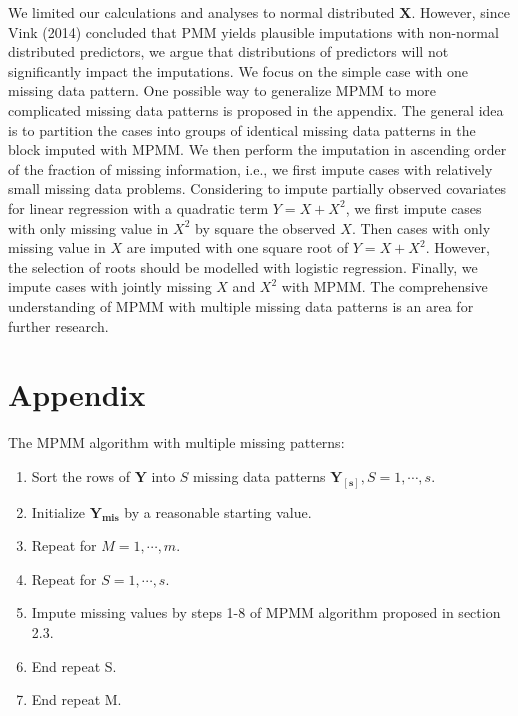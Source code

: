 	We limited our calculations and analyses to normal distributed $\boldsymbol{X}$. However, since Vink (2014) concluded that PMM yields plausible imputations with non-normal distributed predictors, we argue that distributions of predictors will not significantly impact the imputations. We focus on the simple case with one missing data pattern. One possible way to generalize MPMM to more complicated missing data patterns is proposed in the appendix. The general idea is to partition the cases into groups of identical missing data patterns in the block imputed with MPMM. We then perform the imputation in ascending order of the fraction of missing information, i.e., we first impute cases with relatively small missing data problems. Considering to impute partially observed covariates for linear regression with a quadratic term $Y = X + X^2$, we first impute cases with only missing value in $X^2$ by square the observed $X$. Then cases with only missing value in $X$ are imputed with one square root of $Y = X + X^2$. However, the selection of roots should be modelled with logistic regression. Finally, we impute cases with jointly missing $X$ and $X^2$ with MPMM. The comprehensive understanding of MPMM with multiple missing data patterns is an area for further research.         
	
	\section*{Appendix}
	The MPMM algorithm with multiple missing patterns:
	\begin{enumerate}
	\item Sort the rows of $\boldsymbol{Y}$ into $S$ missing data patterns $\boldsymbol{Y_{[s]}}, S=1,\cdots,s$.
	\item Initialize $\boldsymbol{Y_{mis}}$ by a reasonable starting value.
	\item Repeat for $M=1,\cdots,m$.
	\item Repeat for $S=1,\cdots,s$.
	\item Impute missing values by steps 1-8 of MPMM algorithm proposed in section 2.3.
	\item End repeat S.
    \item End repeat M.
\end{enumerate} 
	
	

	


